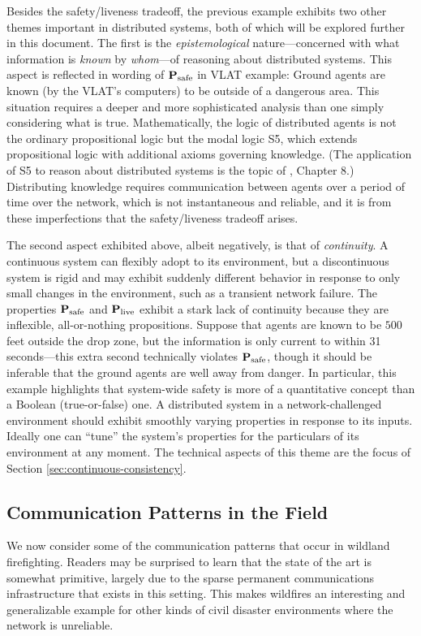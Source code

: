 \documentclass[]             %
{NASA}                       %
\theoremstyle{definition}
\begin{document}
Besides the safety/liveness tradeoff, the previous example exhibits
two other themes important in distributed systems, both of which will
be explored further in this document. The first is the
\emph{epistemological} nature---concerned with what information is
\emph{known} by \emph{whom}---of reasoning about distributed
systems. This aspect is reflected in wording of $\textbf{P}_\textrm{safe}$ in VLAT
example: Ground agents are known (by the VLAT's computers) to be
outside of a dangerous area. This situation requires a deeper and more
sophisticated analysis than one simply considering what is
true. Mathematically, the logic of distributed agents is not the
ordinary propositional logic but the modal logic S5, which extends
propositional logic with additional axioms governing
knowledge. (The application of S5 to reason about distributed systems is the topic of \cite{kshemkalyani_singhal_2008}, Chapter 8.) Distributing knowledge requires communication between agents
over a period of time over the network, which is not instantaneous and
reliable, and it is from these imperfections that the safety/liveness
tradeoff arises.

The second aspect exhibited above, albeit negatively, is that of
\emph{continuity}. A continuous system can flexibly adopt to its
environment, but a discontinuous system is rigid and may exhibit
suddenly different behavior in response to only small changes in the
environment, such as a transient network failure. The properties
$\textbf{P}_\textrm{safe}$ and $\textbf{P}_\textrm{live}$ exhibit a stark lack of continuity because they
are inflexible, all-or-nothing propositions. Suppose that agents are
known to be $500$ feet outside the drop zone, but the information is
only current to within 31 seconds---this extra second technically
violates $\textbf{P}_\textrm{safe}$, though it should be inferable that the ground
agents are well away from danger. In particular, this example
highlights that system-wide safety is more of a quantitative concept
than a Boolean (true-or-false) one. A distributed system in a
network-challenged environment should exhibit smoothly varying
properties in response to its inputs. Ideally one can ``tune'' the
system's properties for the particulars of its environment at any
moment. The technical aspects of this theme are the focus of Section
\ref{sec:continuous-consistency}.

\subsection{Communication Patterns in the Field}
\label{ssec:communication-patterns}
We now consider some of the communication patterns that occur in
wildland firefighting. Readers may be surprised to learn that the
state of the art is somewhat primitive, largely due to the sparse
permanent communications infrastructure that exists in this
setting. This makes wildfires an interesting and generalizable example
for other kinds of civil disaster environments where the network is
unreliable.
\end{document}
